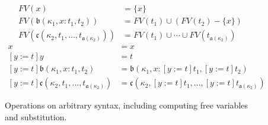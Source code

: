 
\begin{figure}
    \centering
    \begin{align*}
        FV(x) &= \{x\} \\
        FV(\mathfrak{b}(\kappa_1, x : t_1, t_2)) &= FV(t_1) \cup (FV(t_2) - \{x\}) \\
        FV(\mathfrak{c}(\kappa_2, t_1, \ldots, t_{\mathfrak{a}(\kappa_2)})) &= FV(t_1) \cup \cdots \cup FV(t_{\mathfrak{a}(\kappa_2)})
    \end{align*}
    \begin{align*}
        [y := t]x &= x \\
        [y := t]y &= t \\
        [y := t]\mathfrak{b}(\kappa_1, x : t_1, t_2) &= \mathfrak{b}(\kappa_1, x : [y := t]t_1, [y := t]t_2)  \\
        [y := t]\mathfrak{c}(\kappa_2, t_1, \ldots, t_{\mathfrak{a}(\kappa_2)}) &= \mathfrak{c}(\kappa_2, [y := t]t_1, \ldots, [y := t]t_{\mathfrak{a}(\kappa_2)})
    \end{align*}
    \caption{Operations on arbitrary syntax, including computing free variables and substitution.}
    \label{fig:ops_f}
\end{figure}
